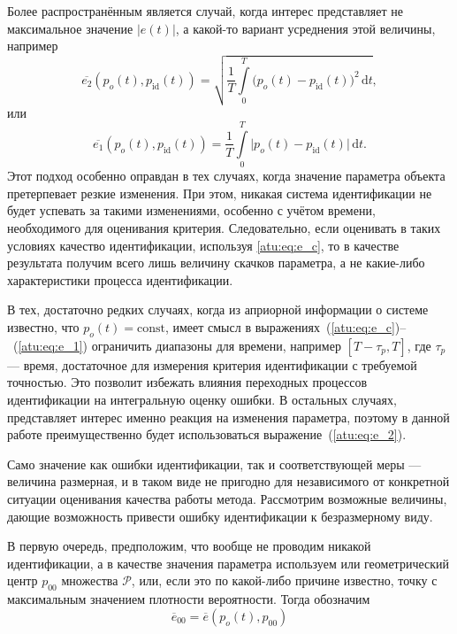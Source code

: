 Более распространённым является случай,
когда интерес представляет не максимальное значение $|e(t)|$,
а какой-то вариант усреднения этой величины, например
%
\begin{equation}
  \overline{e_2}(p_o(t),p_\mathrm{id}(t))
  =
  \sqrt{ \frac{1}{T} \int\limits_{0}^{T} \big( p_o(t)-p_\mathrm{id}(t) \big)^2 \, \mathrm{d}t },
  \label{atu:eq:e_2}
\end{equation}
%
или
\begin{equation}
  \overline{e_1}(p_o(t),p_\mathrm{id}(t))
  =
  \frac{1}{T} \int\limits_{0}^{T} \big| p_o(t)-p_\mathrm{id}(t) \big| \, \mathrm{d}t .
  \label{atu:eq:e_1}
\end{equation}
%
Этот подход особенно оправдан в тех случаях, когда
значение параметра объекта претерпевает резкие изменения.
При этом, никакая система идентификации не будет успевать за такими
изменениями, особенно с учётом времени, необходимого для
оценивания критерия. Следовательно, если оценивать в таких условиях
качество идентификации, используя \ref{atu:eq:e_c},
то в качестве результата получим всего лишь величину
скачков параметра, а не какие-либо характеристики процесса идентификации.

В тех, достаточно редких случаях, когда из априорной
информации о системе известно, что $p_o(t) = \mathrm{const}$,
имеет смысл в выражениях~(\ref{atu:eq:e_c})--~(\ref{atu:eq:e_1})
ограничить диапазоны для времени, например $[T-\tau_p,T]$,
где $\tau_p$ --- время, достаточное для измерения
критерия идентификации с требуемой точностью.
Это позволит избежать влияния переходных процессов
идентификации на интегральную оценку ошибки.
В остальных случаях, представляет интерес именно реакция
на изменения параметра, поэтому в данной работе преимущественно будет
использоваться выражение~(\ref{atu:eq:e_2}).




Само значение как ошибки идентификации, так и соответствующей меры --- величина размерная,
и в таком виде не пригодно для
независимого от конкретной ситуации оценивания качества работы метода.
Рассмотрим возможные величины, дающие возможность привести ошибку идентификации
к безразмерному виду.

В первую очередь, предположим, что вообще не проводим никакой идентификации,
а в качестве значения параметра используем или геометрический центр $p_{00}$ множества $\mathcal{P}$,
или, если это по какой-либо причине известно, точку с максимальным значением плотности вероятности.
Тогда обозначим
%
\begin{equation}
  \overline{e}_{00}
  =
  \overline{e}(p_o(t),p_{00})
  \label{atu:eq:e_00}
\end{equation}

